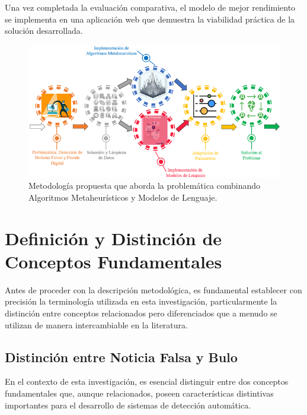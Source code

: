 Una vez completada la evaluación comparativa, el modelo de mejor rendimiento se implementa en una aplicación web que demuestra la viabilidad práctica de la solución desarrollada.

\begin{figure}[h!]
    \centering
    \includegraphics[width=\textwidth]{Imagenes/metodologiaCompleta.png}
    \caption{Metodología propuesta que aborda la problemática combinando Algoritmos Metaheurísticos y Modelos de Lenguaje.}
    \label{fig:metodologia_general}
\end{figure}

\section{Definición y Distinción de Conceptos Fundamentales}
\label{sec:definicion_conceptos}

Antes de proceder con la descripción metodológica, es fundamental establecer con precisión la terminología utilizada en esta investigación, particularmente la distinción entre conceptos relacionados pero diferenciados que a menudo se utilizan de manera intercambiable en la literatura.

\subsection{Distinción entre Noticia Falsa y Bulo}

En el contexto de esta investigación, es esencial distinguir entre dos conceptos fundamentales que, aunque relacionados, poseen características distintivas importantes para el desarrollo de sistemas de detección automática.



